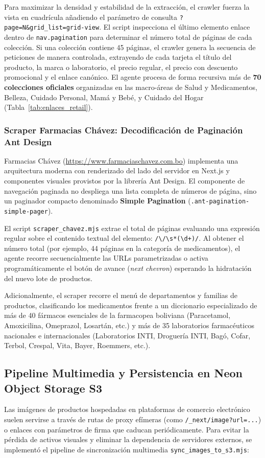 Para maximizar la densidad y estabilidad de la extracción, el crawler fuerza la vista en cuadrícula añadiendo el parámetro de consulta \texttt{?page=N\&grid\_list=grid-view}. El script inspecciona el último elemento enlace dentro de \texttt{nav.pagination} para determinar el número total de páginas de cada colección. Si una colección contiene 45 páginas, el crawler genera la secuencia de peticiones de manera controlada, extrayendo de cada tarjeta el título del producto, la marca o laboratorio, el precio regular, el precio con descuento promocional y el enlace canónico. El agente procesa de forma recursiva más de \textbf{70 colecciones oficiales} organizadas en las macro-áreas de Salud y Medicamentos, Belleza, Cuidado Personal, Mamá y Bebé, y Cuidado del Hogar (Tabla~\ref{tab:enlaces_retail}).

\subsubsection{Scraper Farmacias Chávez: Decodificación de Paginación Ant Design}
Farmacias Chávez (\url{https://www.farmaciaschavez.com.bo}) implementa una arquitectura moderna con renderizado del lado del servidor en Next.js y componentes visuales provistos por la librería Ant Design. El componente de navegación paginada no despliega una lista completa de números de página, sino un paginador compacto denominado \textbf{Simple Pagination} (\texttt{.ant-pagination-simple-pager}).

El script \texttt{scraper\_chavez.mjs} extrae el total de páginas evaluando una expresión regular sobre el contenido textual del elemento: \texttt{/\textbackslash/\textbackslash s*(\textbackslash d+)/}. Al obtener el número total (por ejemplo, 44 páginas en la categoría de medicamentos), el agente recorre secuencialmente las URLs parametrizadas o activa programáticamente el botón de avance (\textit{next chevron}) esperando la hidratación del nuevo lote de productos.

Adicionalmente, el scraper recorre el menú de departamentos y familias de productos, clasificando los medicamentos frente a un diccionario especializado de más de 40 fármacos esenciales de la farmacopea boliviana (Paracetamol, Amoxicilina, Omeprazol, Losartán, etc.) y más de 35 laboratorios farmacéuticos nacionales e internacionales (Laboratorios INTI, Droguería INTI, Bagó, Cofar, Terbol, Crespal, Vita, Bayer, Roemmers, etc.).

\subsection{Pipeline Multimedia y Persistencia en Neon Object Storage S3}
Las imágenes de productos hospedadas en plataformas de comercio electrónico suelen servirse a través de rutas de proxy efímeras (como \texttt{/\_next/image?url=...}) o enlaces con parámetros de firma que caducan periódicamente. Para evitar la pérdida de activos visuales y eliminar la dependencia de servidores externos, se implementó el pipeline de sincronización multimedia \texttt{sync\_images\_to\_s3.mjs}:

